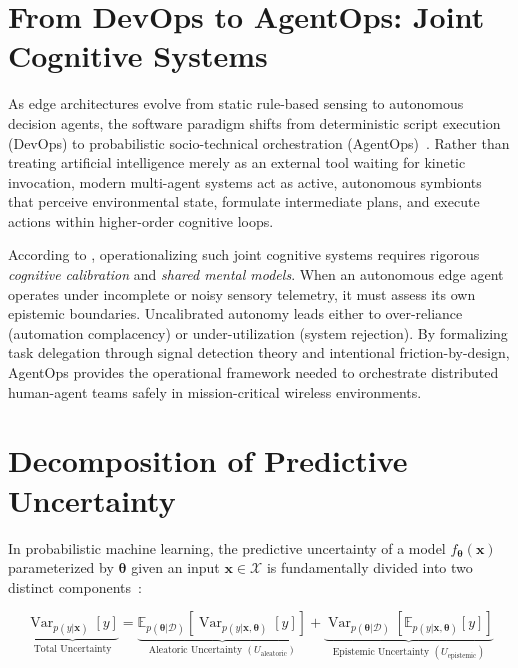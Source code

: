 \section{From DevOps to AgentOps: Joint Cognitive Systems}
\label{sec:bg_agentops}

As edge architectures evolve from static rule-based sensing to autonomous decision agents, the software paradigm shifts from deterministic script execution (DevOps) to probabilistic socio-technical orchestration (AgentOps)~\cite{meissner2026human}. Rather than treating artificial intelligence merely as an external tool waiting for kinetic invocation, modern multi-agent systems act as active, autonomous symbionts that perceive environmental state, formulate intermediate plans, and execute actions within higher-order cognitive loops. 

According to \textcite{meissner2026human}, operationalizing such joint cognitive systems requires rigorous \emph{cognitive calibration} and \emph{shared mental models}. When an autonomous edge agent operates under incomplete or noisy sensory telemetry, it must assess its own epistemic boundaries. Uncalibrated autonomy leads either to over-reliance (automation complacency) or under-utilization (system rejection). By formalizing task delegation through signal detection theory and intentional friction-by-design, AgentOps provides the operational framework needed to orchestrate distributed human-agent teams safely in mission-critical wireless environments.

\section{Decomposition of Predictive Uncertainty}
\label{sec:bg_uncertainty_decomp}

In probabilistic machine learning, the predictive uncertainty of a model $f_{\boldsymbol{\theta}}(\mathbf{x})$ parameterized by $\boldsymbol{\theta}$ given an input $\mathbf{x} \in \mathcal{X}$ is fundamentally divided into two distinct components~\cite{kendall2017uncertainties}:

\begin{equation}
    \underbrace{\operatorname{Var}_{p(y|\mathbf{x})}[y]}_{\text{Total Uncertainty}} = \underbrace{\mathbb{E}_{p(\boldsymbol{\theta}|\mathcal{D})}\left[\operatorname{Var}_{p(y|\mathbf{x},\boldsymbol{\theta})}[y]\right]}_{\text{Aleatoric Uncertainty } (U_{\text{aleatoric}})} + \underbrace{\operatorname{Var}_{p(\boldsymbol{\theta}|\mathcal{D})}\left[\mathbb{E}_{p(y|\mathbf{x},\boldsymbol{\theta})}[y]\right]}_{\text{Epistemic Uncertainty } (U_{\text{epistemic}})}
    \label{eq:uncertainty_decomp}
\end{equation}

